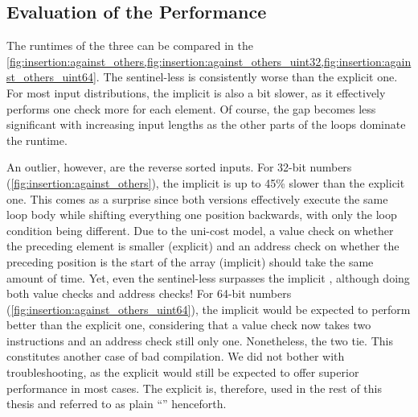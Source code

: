 \subsection*{Evaluation of the Performance}
\label{sec:tasklet:insertion:performance}

\def\insertionalgos{1NoSentinel,1,1Implicit,BubbleNonAdapt,BubbleAdapt,Selection}


The runtimes of the three \IS*{} can be compared in the \cref{fig:insertion:against_others,fig:insertion:against_others_uint32,fig:insertion:against_others_uint64}.
The sentinel-less \IS{} is consistently worse than the explicit one.
For most input distributions, the implicit \IS{} is also a bit slower, as it effectively performs one check more for each element.
Of course, the gap becomes less significant with increasing input lengths as the other parts of the loops dominate the runtime.

An outlier, however, are the reverse sorted inputs.
For 32-bit numbers (\cref{fig:insertion:against_others}), the implicit \IS{} is up to 45\% slower than the explicit one.
This comes as a surprise since both versions effectively execute the same loop body while shifting everything one position backwards, with only the loop condition being different.
Due to the uni-cost model, a value check on whether the preceding element is smaller (explicit) and an address check on whether the preceding position is the start of the array (implicit) should take the same amount of time.
Yet, even the sentinel-less \IS{} surpasses the implicit \IS{}, although doing both value checks and address checks!
For 64-bit numbers (\cref{fig:insertion:against_others_uint64}), the implicit \IS{} would be expected to perform better than the explicit one, considering that a value check now takes two instructions and an address check still only one.
Nonetheless, the two \IS*{} tie.
This constitutes another case of bad compilation.
We did not bother with troubleshooting, as the explicit \IS{} would still be expected to offer superior performance in most cases.
The explicit \IS{} is, therefore, used in the rest of this thesis and referred to as plain \enquote{\IS{}} henceforth.

